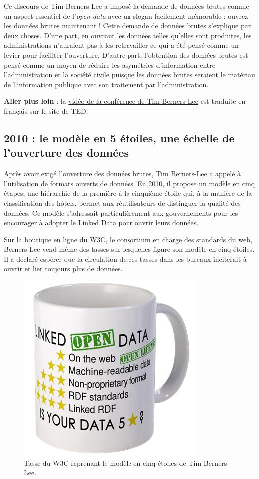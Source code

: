 \documentclass[]{book}
\theoremstyle{definition}
\theoremstyle{definition}
\theoremstyle{definition}
\theoremstyle{remark}
\begin{document}
Ce discours de Tim Berners-Lee a imposé la demande de données brutes
comme un aspect essentiel de l'\emph{open data} avec un slogan
facilement mémorable : ouvrez les données brutes maintenant ! Cette
demande de données brutes s'explique par deux choses. D'une part, en
ouvrant les données telles qu'elles sont produites, les administrations
n'auraient pas à les retravailler ce qui a été pensé comme un levier
pour faciliter l'ouverture. D'autre part, l'obtention des données brutes
est pensé comme un moyen de réduire les asymétries d'information entre
l'administration et la société civile puisque les données brutes
seraient le matériau de l'information publique avec son traitement par
l'administration.

\textbf{Aller plus loin} : la
\href{https://www.ted.com/talks/tim_berners_lee_on_the_next_web?language=fr}{vidéo
de la conférence de Tim Berners-Lee} est traduite en français sur le
site de TED.

\subsection{2010 : le modèle en 5 étoiles, une échelle de l'ouverture
des
données}\label{le-modele-en-5-etoiles-une-echelle-de-louverture-des-donnees}

Après avoir exigé l'ouverture des données brutes, Tim Berners-Lee a
appelé à l'utilisation de formats ouverts de données. En 2010, il
propose un modèle en cinq étapes, une hiérarchie de la première à la
cinquième étoile qui, à la manière de la classification des hôtels,
permet aux réutilisateurs de distinguer la qualité des données. Ce
modèle s'adressait particulièrement aux gouvernements pour les
encourager à adopter le Linked Data pour ouvrir leurs données.

Sur la \href{http://www.cafepress.com/w3c_shop.597992118}{boutique en
ligne du W3C}, le consortium en charge des standards du web, Berners-Lee
vend même des tasses sur lesquelles figure son modèle en cinq étoiles.
Il a déclaré espérer que la circulation de ces tasses dans les bureaux
inciterait à ouvrir et lier toujours plus de données.\\

\begin{figure}

{\centering \includegraphics[width=0.3\linewidth]{./img/mug} 

}

\caption{Tasse du W3C reprenant le modèle en cinq étoiles de Tim Berners-Lee.}\label{fig:unnamed-chunk-4}
\end{figure}
\end{document}
